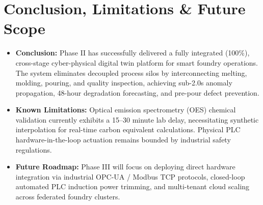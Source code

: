 \documentclass[11pt, a4paper]{article}
\begin{document}
\section{Conclusion, Limitations \& Future Scope}
\begin{itemize}[noitemsep, topsep=2pt]
    \item \textbf{Conclusion:} Phase II has successfully delivered a fully integrated (100\%), cross-stage cyber-physical digital twin platform for smart foundry operations. The system eliminates decoupled process silos by interconnecting melting, molding, pouring, and quality inspection, achieving sub-2.0s anomaly propagation, 48-hour degradation forecasting, and pre-pour defect prevention.
    \item \textbf{Known Limitations:} Optical emission spectrometry (OES) chemical validation currently exhibits a 15--30 minute lab delay, necessitating synthetic interpolation for real-time carbon equivalent calculations. Physical PLC hardware-in-the-loop actuation remains bounded by industrial safety regulations.
    \item \textbf{Future Roadmap:} Phase III will focus on deploying direct hardware integration via industrial OPC-UA / Modbus TCP protocols, closed-loop automated PLC induction power trimming, and multi-tenant cloud scaling across federated foundry clusters.
\end{itemize}

\end{document}
